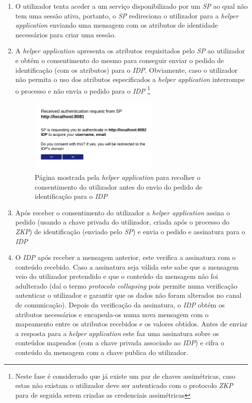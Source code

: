 \begin{enumerate}
    \item O utilizador tenta aceder a um serviço disponibilizado por um \textit{SP} ao qual não tem uma sessão ativa, portanto, o \textit{SP} redireciona o utilizador para a \textit{helper application} enviando uma mensagem com os atributos de identidade necessários para criar uma sessão.
    \item A \textit{helper application} apresenta os atributos requisitados pelo \textit{SP} ao utilizador e obtém o consentimento do mesmo para conseguir enviar o pedido de identificação (com os atributos) para o \textit{IDP}. Obviamente, caso o utilizador não permita o uso dos atributos especificados a \textit{helper application} interrompe o processo e não envia o pedido para o \textit{IDP} \footnote{Neste fase é considerado que já existe um par de chaves assimétricas, caso estas não existam o utilizador deve ser autenticado com o protocolo \textit{ZKP} para de seguida serem criadas as credenciais assimétricas }
    \begin{figure}[H]
        \caption{Página mostrada pela \textit{helper application} para recolher o consentimento do utilizador antes do envio do pedido de identificação para o \textit{IDP}}
        \includegraphics[width=0.6\textwidth]{img/request_conse.png}
        \centering
    \end{figure}
    \item Após receber o consentimento do utilizador a \textit{helper application} assina o pedido (usando a chave privada do utilizador, criada após o processo do \textit{ZKP}) de identificação (enviado pelo \textit{SP}) e envia o pedido e assinatura para o \textit{IDP}
    \item O \textit{IDP} após receber a mensagem anterior, este verifica a assinatura com o conteúdo recebido. Caso a assinatura seja válida este sabe que a mensagem veio do utilizador pretendido e que o conteúdo da mensagem não foi adulterado (daí o termo \textit{protocolo collapsing} pois permite numa verificação autenticar o utilizador e garantir que os dados não foram alterados no canal de comunicação). Depois da verificação da assinatura, o \textit{IDP} obtém os atributos necessários e encapsula-os numa nova mensagem com o mapeamento entre os atributos recebidos e os valores obtidos. Antes de enviar a resposta para a \textit{helper application} este faz uma assinatura sobre os conteúdos mapeados (com a chave privada associado ao \textit{IDP}) e cifra o conteúdo da mensagem com a chave publica do utilizador.

\end{enumerate}
